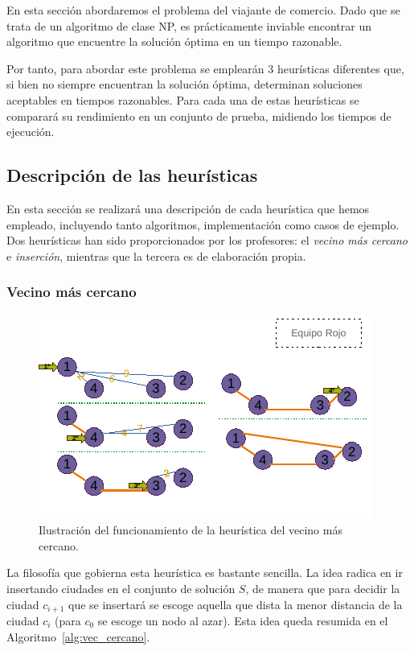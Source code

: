 En esta sección abordaremos el problema del viajante de comercio. Dado que
se trata de un algoritmo de clase NP, es prácticamente inviable encontrar 
un algoritmo que encuentre la solución óptima en un tiempo razonable.

Por tanto, para abordar este problema se emplearán 3 heurísticas diferentes que,
si bien no siempre encuentran la solución óptima, determinan soluciones 
aceptables en tiempos razonables. Para cada una de
estas heurísticas se comparará su rendimiento en un conjunto de prueba,
midiendo los tiempos de ejecución. 

\subsection{Descripción de las heurísticas}

En esta sección se realizará una descripción de cada heurística que hemos 
empleado, incluyendo tanto algoritmos, implementación como casos de ejemplo.
Dos heurísticas han sido proporcionados por los profesores: el \textit{vecino
más cercano} e \textit{inserción}, mientras que la tercera es de
elaboración propia.

\subsubsection{Vecino más cercano}

\begin{figure}[H] 
  \centering
  \includegraphics[scale=1.5]{img/DibVecCercano.pdf}
  \caption{Ilustración del funcionamiento de la heurística del vecino más cercano.}
  \label{fig:vec}
\end{figure}

La filosofía que gobierna esta heurística es bastante sencilla. La idea 
radica en ir insertando ciudades en el conjunto de solución $S$, de manera
que para decidir la ciudad $c_{i+1}$ que se insertará se escoge aquella que
dista la menor distancia de la ciudad $c_i$ (para $c_0$ se escoge
un nodo al azar). Esta idea queda resumida en el Algoritmo~\ref{alg:vec_cercano}. 

